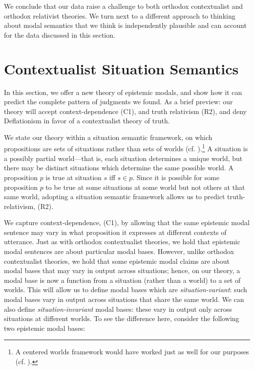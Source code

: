 \documentclass[11pt]{article}
\begin{document}
\begin{doublespace}
We conclude that our data raise a challenge to both orthodox contextualist and orthodox relativist theories. We turn next to a different approach to thinking about modal semantics that we think is independently plausible and can account for the data discussed in this section.

\section{Contextualist Situation Semantics}
\label{3}

In this section, we offer a new theory of epistemic modals, and show how it can predict the complete pattern of judgments we found. As a brief preview: our theory will accept context-dependence (C1), and truth relativism (R2), and deny {\sc Deflationism} in favor of a contextualist theory of truth. 

We state our theory within a situation semantic framework, on which propositions are sets of situations rather than sets of worlds (cf. \citealt{kratzer:1989, kratzer:2012}).\footnote{A centered worlds framework would have worked just as well for our purposes (cf. \citealt{egan:2007}).} A situation is a possibly partial world---that is, each situation determines a unique world, but there may be distinct situations which determine the same possible world. A proposition $p$ is true at situation $s$ iff $s\in p$. Since it is possible for some proposition $p$ to be true at some situations at some world but not others at that same world, adopting a situation semantic framework allows us to predict truth-relativism, (R2). 

We capture context-dependence, (C1), by allowing that the same epistemic modal sentence may vary in what proposition it expresses at different contexts of utterance. Just as with orthodox contextualist theories, we hold that epistemic modal sentences are about particular modal bases. However, unlike orthodox contextualist theories, we hold that some epistemic modal claims are about modal bases that may vary in output across situations; hence, on our theory, a modal base is now a function from a situation (rather than a world) to a set of worlds. This will allow us to define modal bases which are {\it situation-variant}: such modal bases vary in output across situations that share the same world. We can also define {\it situation-invariant} modal bases: these vary in output only across situations at different worlds. To see the difference here, consider the following two epistemic modal bases:


\end{doublespace}
\end{document}
